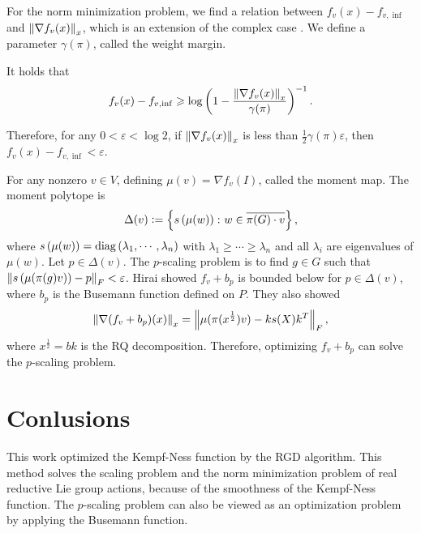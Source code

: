 \documentclass[papersize]{suribtabst}
\begin{document}
	For the norm minimization problem, we find a relation between $f_v(x)- f_{v,\inf}$ and $\left\lVert\nabla f_v(x)\right\lVert_{x}$, which is an extension of the complex case \cite{key8}. We define a parameter $\gamma(\pi)$, called the weight margin.
	\begin{thm}
		It holds that
		\begin{equation*}
			f_v(x)- f_{v,\inf} \geqslant\log\left(1-\frac{\left\lVert\nabla f_v(x)\right\lVert_{x}}{\gamma(\pi)}\right)^{-1}.
		\end{equation*}
	\end{thm}
	Therefore, for any $0<\varepsilon<\log 2$, if $\left\lVert\nabla f_v(x)\right\lVert_{x}$ is less than $\frac{1}{2}\gamma(\pi)\varepsilon$, then $f_v(x)- f_{v,\inf} < \varepsilon$. %

	For any nonzero $v \in V$, defining $\mu(v) = \nabla f_v(I)$, called the moment map. The moment polytope is
	\begin{equation*}
		\Delta(v) \vcentcolon= \left\{s\left(\mu(w)\right) \colon w \in \overline{\pi(G)\cdot v}\right\},
	\end{equation*}
	where $s\left(\mu(w)\right) = \operatorname{diag}\left(\lambda_1,\cdots,\lambda_n\right)$ with $\lambda_1 \geqslant \cdots \geqslant\lambda_n$ and all $\lambda_i$ are eigenvalues of $\mu(w)$. Let $p \in \Delta(v)$. The $p$-scaling problem is to find $g \in G$ such that $\left\lVert s\left(\mu(\pi(g)v)\right)-p\right\lVert_{F} < \varepsilon$. Hirai \cite{key12} showed $f_v+b_p$ is bounded below for $p \in \Delta(v)$, where $b_p$ is the Busemann function defined on $P$. They also showed
	\begin{equation*}
		\left\lVert\nabla(f_v+b_p)(x)\right\lVert_{x} = \left\lVert\mu(\pi(x^{\frac{1}{2}})v)-ks(X)k^T\right\lVert_{F},
	\end{equation*}
	where $x^{\frac{1}{2}} = bk$ is the RQ decomposition. Therefore, optimizing $f_v+b_p$ can solve the $p$-scaling problem.

	\section{Conlusions}

	This work optimized the Kempf-Ness function by the RGD algorithm. This method solves the scaling problem and the norm minimization problem of real reductive Lie group actions, because of the smoothness of the Kempf-Ness function. The $p$-scaling problem can also be viewed as an optimization problem by applying the Busemann function.

	\begin{spacing}{0.8}
		\printbibliography
	\end{spacing}
\end{document}
